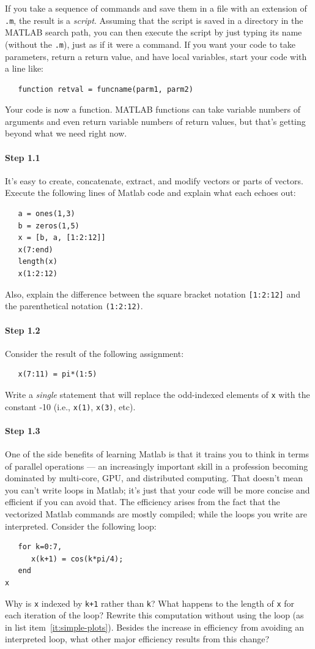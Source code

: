 If you take a sequence of commands and save them in a file with an
extension of \texttt{.m}, the result is a \emph{script}. Assuming that the
script is saved in a directory in the MATLAB search path, you can then
execute the script by just typing its name (without the \texttt{.m}),
just as if it were a command. If you want your code to take
parameters, return a return value, and have local variables, start
your code with a line like:
\begin{verbatim}
   function retval = funcname(parm1, parm2)
\end{verbatim}
Your code is now a function. MATLAB functions can take variable
numbers of arguments and even return variable numbers of return
values, but that's getting beyond what we need right now.

\paragraph{Step 1.1} It's easy to create, concatenate, extract, and modify
vectors or parts of vectors. Execute the following lines of Matlab
code and explain what each echoes out: 
\begin{verbatim}
   a = ones(1,3)
   b = zeros(1,5)
   x = [b, a, [1:2:12]]
   x(7:end)
   length(x)
   x(1:2:12)
\end{verbatim}
Also, explain the difference between the square bracket notation
\verb|[1:2:12]| and the parenthetical notation \verb|(1:2:12)|.

\paragraph{Step 1.2} Consider the result of the following assignment:
\begin{verbatim}
   x(7:11) = pi*(1:5)
\end{verbatim}
Write a \emph{single} statement that will replace the odd-indexed
elements of \texttt{x} with the constant -10 (i.e., \texttt{x(1)},
\texttt{x(3)}, etc).


\paragraph{Step 1.3} One of the side benefits of learning Matlab is
that it trains you to think in terms of parallel operations --- an
increasingly important skill in a profession becoming dominated by
multi-core, GPU, and distributed computing. That doesn't mean you
can't write loops in Matlab; it's just that your code will be more
concise and efficient if you can avoid that. The efficiency arises
from the fact that the vectorized Matlab commands are mostly compiled;
while the loops you write are interpreted. Consider the following loop:
\begin{verbatim}
   for k=0:7,
      x(k+1) = cos(k*pi/4);
   end
x
\end{verbatim}
Why is \verb|x| indexed by \verb|k+1| rather than \verb|k|? What
happens to the length of \verb|x| for each iteration of the loop?
Rewrite this computation without using the loop (as in list
item~\ref{it:simple-plots}). Besides the increase in efficiency from
avoiding an interpreted loop, what other major efficiency results from
this change?

